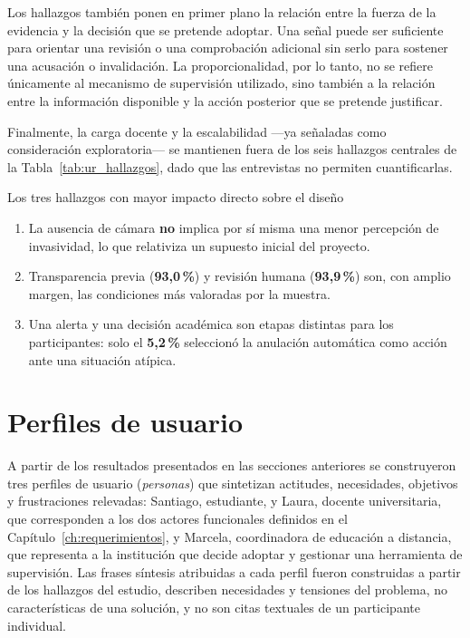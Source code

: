 Los hallazgos también ponen en primer plano la relación entre la fuerza de la evidencia y la decisión que se pretende adoptar. Una señal puede ser suficiente para orientar una revisión o una comprobación adicional sin serlo para sostener una acusación o invalidación. La proporcionalidad, por lo tanto, no se refiere únicamente al mecanismo de supervisión utilizado, sino también a la relación entre la información disponible y la acción posterior que se pretende justificar.

Finalmente, la carga docente y la escalabilidad ---ya señaladas como consideración exploratoria--- se mantienen fuera de los seis hallazgos centrales de la Tabla~\ref{tab:ur_hallazgos}, dado que las entrevistas no permiten cuantificarlas.

\begin{keyfinding}{Los tres hallazgos con mayor impacto directo sobre el diseño}
\begin{enumerate}
    \item La ausencia de cámara \textbf{no} implica por sí misma una menor percepción de invasividad, lo que relativiza un supuesto inicial del proyecto.
    \item Transparencia previa (\textbf{93,0\,\%}) y revisión humana (\textbf{93,9\,\%}) son, con amplio margen, las condiciones más valoradas por la muestra.
    \item Una alerta y una decisión académica son etapas distintas para los participantes: solo el \textbf{5,2\,\%} seleccionó la anulación automática como acción ante una situación atípica.
\end{enumerate}
\end{keyfinding}

\section{Perfiles de usuario}

A partir de los resultados presentados en las secciones anteriores se construyeron tres perfiles de usuario (\textit{personas}) que sintetizan actitudes, necesidades, objetivos y frustraciones relevadas: Santiago, estudiante, y Laura, docente universitaria, que corresponden a los dos actores funcionales definidos en el Capítulo~\ref{ch:requerimientos}, y Marcela, coordinadora de educación a distancia, que representa a la institución que decide adoptar y gestionar una herramienta de supervisión. Las frases síntesis atribuidas a cada perfil fueron construidas a partir de los hallazgos del estudio, describen necesidades y tensiones del problema, no características de una solución, y no son citas textuales de un participante individual.

